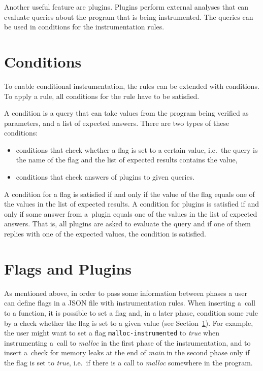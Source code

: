 Another useful feature are plugins. Plugins perform external analyses that can
evaluate queries about the program that is being instrumented. The
queries can be used in conditions for the instrumentation rules.

\section{Conditions}\label{sec:conditions}

To enable conditional instrumentation, the rules can be extended with
conditions. To apply a rule, all conditions for the rule have to be satisfied.

A condition is a query that can take values from the program being verified as
parameters, and a list of expected answers. There are two types of these
conditions:
\begin{itemize}
 \item conditions that check whether a flag is set to a certain value, i.e.~the
 query is the name of the flag and the list of expected results contains the value,
 \item conditions that check answers of plugins to given queries.
\end{itemize}

A condition for a flag is satisfied if and only if the value of the flag equals
one of the values in the list of expected results. A condition for plugins is
satisfied if and only if some answer from a~plugin equals one of the values in
the list of expected answers. That is, all plugins are asked to evaluate the
query and if one of them replies with one of the expected values, the condition
is satisfied.

\section{Flags and Plugins}

As mentioned above, in order to pass some information between phases a user can
define flags in a JSON file with instrumentation rules. When inserting a~call
to a function, it is possible to set a flag and, in a later phase, condition
some rule by a check whether the flag is set to a given value (see
Section~\ref{sec:conditions}).  For example, the user might want to set a flag
\texttt{malloc-instrumented} to \emph{true} when instrumenting a~call to
\emph{malloc} in the first phase of the instrumentation, and to insert a~check
for memory leaks at the end of \emph{main} in the second phase only if the flag
    is set to \emph{true}, i.e.~if there is a call to \emph{malloc} somewhere
    in the program.

